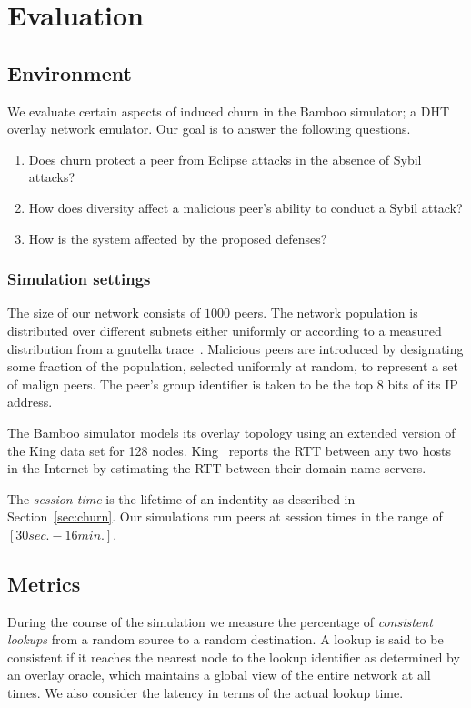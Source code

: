 \section{Evaluation}\label{sec:evaluation}

\subsection{Environment}
We evaluate certain aspects of induced churn in the Bamboo simulator; a DHT overlay network emulator. Our goal is to answer the following questions.
\begin{enumerate}
\item Does churn protect a peer from Eclipse attacks in the absence of Sybil attacks?
\item How does diversity affect a malicious peer's ability to conduct a Sybil attack?
\item How is the system affected by the proposed defenses?
\end{enumerate}
 
\subsubsection{Simulation settings}
The size of our network consists of $1000$ peers. The network population is distributed over different subnets either uniformly or according to a measured distribution from a gnutella trace~\cite{Boon}. Malicious peers are introduced by designating some fraction of the population, selected uniformly at random, to represent a set of malign peers. The peer's group identifier is taken to be the top $8$ bits of its IP address. 

The Bamboo simulator models its overlay topology using an extended version of the
King data set for 128 nodes. King~\cite{King2002} reports the RTT between any two 
hosts in the Internet by estimating the RTT between their domain name servers.  

The \textit{session time} is the lifetime of an indentity as described in
Section~\ref{sec:churn}. Our simulations run peers at session times in
the range of $[30sec.-16min.]$.

\subsection{Metrics}

During the course of the simulation we measure the percentage of \emph{consistent lookups} 
from a random source to a random destination. A lookup is said to be consistent if it reaches 
the nearest node to the lookup identifier as determined by an overlay oracle, which maintains 
a global view of the entire network at all times. We also consider the latency in terms of the actual 
lookup time.

